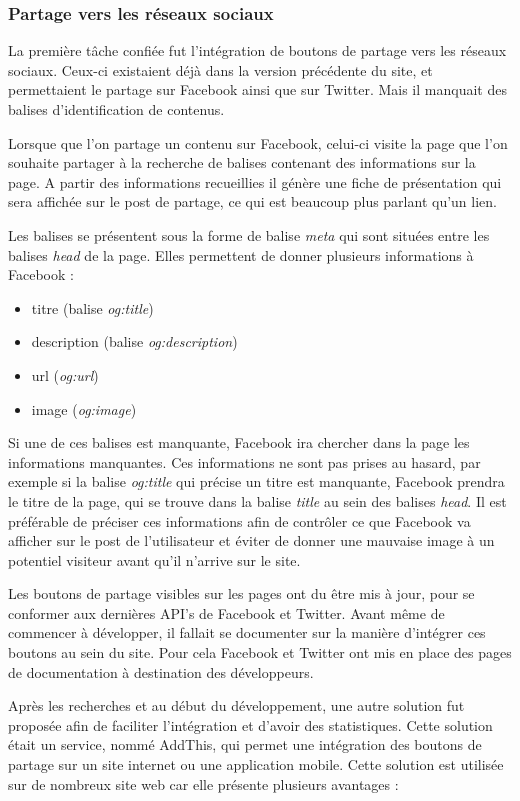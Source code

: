 \documentclass[12pt,a4paper]{article}
\begin{document}
\subsubsection{Partage vers les réseaux sociaux}
La première tâche confiée fut l'intégration de boutons de partage vers les réseaux sociaux. Ceux-ci existaient déjà dans la version précédente du site, et permettaient le partage sur Facebook ainsi que sur Twitter. Mais il manquait des balises d'identification de contenus.\par 
Lorsque que l'on partage un contenu sur Facebook, celui-ci visite la page que l'on souhaite partager à la recherche de balises contenant des informations sur la page. A partir des informations recueillies il génère une fiche de présentation qui sera affichée sur le post de partage, ce qui est beaucoup plus parlant qu'un lien.\par
Les balises se présentent sous la forme de balise \textit{meta} qui sont situées entre les balises \textit{head} de la page. Elles permettent de donner plusieurs informations à Facebook :
\begin{itemize}
\item titre (balise \textit{og:title})
\item description (balise \textit{og:description})
\item url (\textit{og:url})
\item image (\textit{og:image})
\end{itemize}
Si une de ces balises est manquante, Facebook ira chercher dans la page les informations manquantes. Ces informations ne sont pas prises au hasard, par exemple si la balise \textit{og:title} qui précise un titre est manquante, Facebook prendra le titre de la page, qui se trouve dans la balise \textit{title} au sein des balises \textit{head}. Il est préférable de préciser ces informations afin de contrôler ce que Facebook va afficher sur le post de l'utilisateur et éviter de donner une mauvaise image à un potentiel visiteur avant qu'il n'arrive sur le site.\par
\bigskip
Les boutons de partage visibles sur les pages ont du être mis à jour, pour se conformer aux dernières API's de Facebook et Twitter. Avant même de commencer à développer, il fallait se documenter sur la manière d'intégrer ces boutons au sein du site. Pour cela Facebook et Twitter ont mis en place des pages de documentation à destination des développeurs. \par 
Après les recherches et au début du développement, une autre solution fut proposée afin de faciliter l'intégration et d'avoir des statistiques. Cette solution était un service, nommé AddThis, qui permet une intégration des boutons de partage sur un site internet ou une application mobile. Cette solution est utilisée sur de nombreux site web car elle présente plusieurs avantages : 
\end{document}
